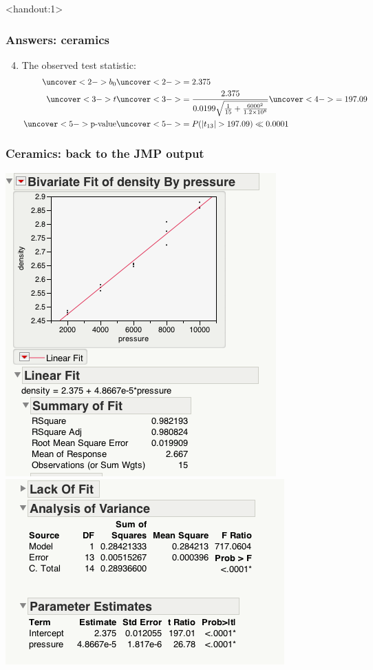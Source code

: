 \documentclass[handout]{beamer}\usepackage[]{graphicx}\usepackage[]{color}
\newcommand{\answers}{1}
\numberwithin{equation}{section}
\begin{document}
\begin{frame}<handout:\answers>
\frametitle{Answers: ceramics}
\begin{enumerate}[1. ]
\setcounter{enumi}{3}
\item The observed test statistic:
\begin{align*}
\uncover<2->{b_0} & \uncover<2->{= 2.375} \\
\uncover<3->{t} & \uncover<3->{= \frac{2.375}{0.0199 \sqrt{ \frac{1}{15} + \frac{6000^2}{1.2 \times 10^8}}}} \uncover<4->{ = 197.09} \\
\uncover<5->{\text{p-value}} &\uncover<5->{= P(|t_{13}| > 197.09) \ll 0.0001}
\end{align*}
\end{enumerate}
\end{frame}

\begin{frame}
\frametitle{Ceramics: back to the JMP output}
\begin{center}
 \includegraphics{../../fig/jmpcer1.png}
 \includegraphics{../../fig/jmpcer2.png}
\end{center}
\end{frame}
\end{document}
